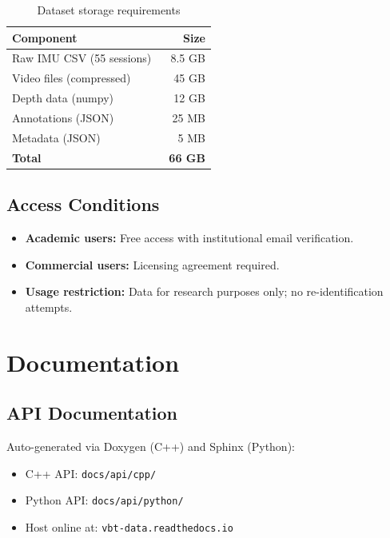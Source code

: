 \begin{table}[h]
    \centering
    \caption{Dataset storage requirements}
    \label{tab:dataset_size}
    \begin{tabular}{lr}
        \toprule
        \textbf{Component} & \textbf{Size} \\
        \midrule
        Raw IMU CSV (55 sessions) & 8.5 GB \\
        Video files (compressed) & 45 GB \\
        Depth data (numpy) & 12 GB \\
        Annotations (JSON) & 25 MB \\
        Metadata (JSON) & 5 MB \\
        \midrule
        \textbf{Total} & \textbf{~66 GB} \\
        \bottomrule
    \end{tabular}
\end{table}

\subsection{Access Conditions}

\begin{itemize}
    \item \textbf{Academic users:} Free access with institutional email verification.
    \item \textbf{Commercial users:} Licensing agreement required.
    \item \textbf{Usage restriction:} Data for research purposes only; no re-identification attempts.
\end{itemize}

\section{Documentation}

\subsection{API Documentation}

Auto-generated via Doxygen (C++) and Sphinx (Python):
\begin{itemize}
    \item C++ API: \texttt{docs/api/cpp/}
    \item Python API: \texttt{docs/api/python/}
    \item Host online at: \texttt{vbt-data.readthedocs.io}
\end{itemize}

